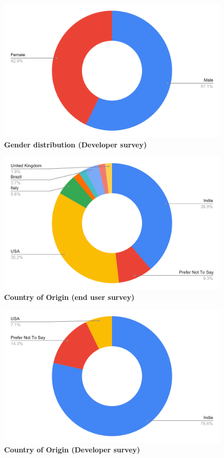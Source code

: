 \begin{figure}[H]
  \centering
  \includegraphics[width=13cm]{thesis/paper/images/p2d_gender.pdf}
  \textbf{Gender distribution (Developer survey)}
\end{figure}

\begin{figure}[H]
  \centering
  \includegraphics[width=13cm]{thesis/paper/images/p2u_country.pdf}
  \textbf{Country of Origin (end user survey)}
\end{figure}

\begin{figure}[H]
  \centering
  \includegraphics[width=13cm]{thesis/paper/images/p2d_country.pdf}
  \textbf{Country of Origin (Developer survey)}
\end{figure}

